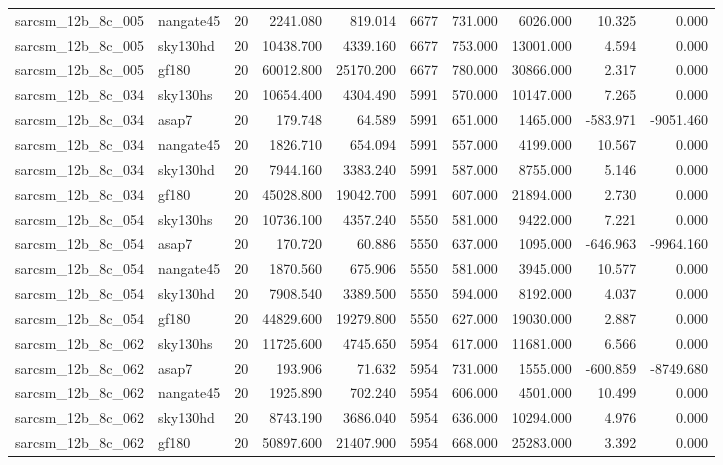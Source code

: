 \begin{tabular}{llrrrrrrrr}
sarcsm\_12b\_8c\_005 & nangate45 & 20 & 2241.080 & 819.014 & 6677 & 731.000 & 6026.000 & 10.325 & 0.000 \\
sarcsm\_12b\_8c\_005 & sky130hd & 20 & 10438.700 & 4339.160 & 6677 & 753.000 & 13001.000 & 4.594 & 0.000 \\
sarcsm\_12b\_8c\_005 & gf180 & 20 & 60012.800 & 25170.200 & 6677 & 780.000 & 30866.000 & 2.317 & 0.000 \\
sarcsm\_12b\_8c\_034 & sky130hs & 20 & 10654.400 & 4304.490 & 5991 & 570.000 & 10147.000 & 7.265 & 0.000 \\
sarcsm\_12b\_8c\_034 & asap7 & 20 & 179.748 & 64.589 & 5991 & 651.000 & 1465.000 & -583.971 & -9051.460 \\
sarcsm\_12b\_8c\_034 & nangate45 & 20 & 1826.710 & 654.094 & 5991 & 557.000 & 4199.000 & 10.567 & 0.000 \\
sarcsm\_12b\_8c\_034 & sky130hd & 20 & 7944.160 & 3383.240 & 5991 & 587.000 & 8755.000 & 5.146 & 0.000 \\
sarcsm\_12b\_8c\_034 & gf180 & 20 & 45028.800 & 19042.700 & 5991 & 607.000 & 21894.000 & 2.730 & 0.000 \\
sarcsm\_12b\_8c\_054 & sky130hs & 20 & 10736.100 & 4357.240 & 5550 & 581.000 & 9422.000 & 7.221 & 0.000 \\
sarcsm\_12b\_8c\_054 & asap7 & 20 & 170.720 & 60.886 & 5550 & 637.000 & 1095.000 & -646.963 & -9964.160 \\
sarcsm\_12b\_8c\_054 & nangate45 & 20 & 1870.560 & 675.906 & 5550 & 581.000 & 3945.000 & 10.577 & 0.000 \\
sarcsm\_12b\_8c\_054 & sky130hd & 20 & 7908.540 & 3389.500 & 5550 & 594.000 & 8192.000 & 4.037 & 0.000 \\
sarcsm\_12b\_8c\_054 & gf180 & 20 & 44829.600 & 19279.800 & 5550 & 627.000 & 19030.000 & 2.887 & 0.000 \\
sarcsm\_12b\_8c\_062 & sky130hs & 20 & 11725.600 & 4745.650 & 5954 & 617.000 & 11681.000 & 6.566 & 0.000 \\
sarcsm\_12b\_8c\_062 & asap7 & 20 & 193.906 & 71.632 & 5954 & 731.000 & 1555.000 & -600.859 & -8749.680 \\
sarcsm\_12b\_8c\_062 & nangate45 & 20 & 1925.890 & 702.240 & 5954 & 606.000 & 4501.000 & 10.499 & 0.000 \\
sarcsm\_12b\_8c\_062 & sky130hd & 20 & 8743.190 & 3686.040 & 5954 & 636.000 & 10294.000 & 4.976 & 0.000 \\
sarcsm\_12b\_8c\_062 & gf180 & 20 & 50897.600 & 21407.900 & 5954 & 668.000 & 25283.000 & 3.392 & 0.000 \\

\end{tabular}
